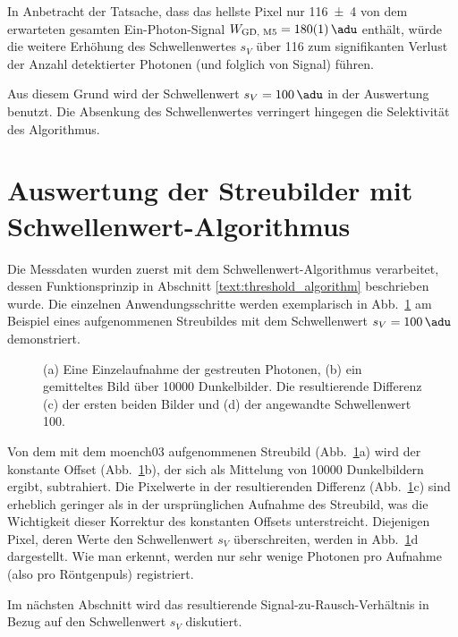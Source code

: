 \noindent
In Anbetracht der Tatsache, dass das hellste Pixel nur \SI{116(4)}{\adu} von dem erwarteten gesamten Ein-Photon-Signal $W_\text{GD, M5} = \SI{180(1)}{\adu}$ enthält, würde die weitere Erhöhung des Schwellenwertes $s_V$ über \SI{116}{\adu} zum signifikanten Verlust der Anzahl detektierter Photonen (und folglich von Signal) führen.

\noindent
Aus diesem Grund wird der Schwellenwert $s_V = \SI{100}{\adu}$ in der Auswertung benutzt. Die Absenkung des Schwellenwertes verringert hingegen die Selektivität des Algorithmus.

\section{Auswertung der Streubilder mit Schwellenwert-Algorithmus}
\label{text:streuung_counting}
Die Messdaten wurden zuerst mit dem Schwellenwert-Algorithmus verarbeitet, dessen Funktionsprinzip in Abschnitt \ref{text:threshold_algorithm} beschrieben wurde. Die einzelnen Anwendungsschritte werden exemplarisch in Abb.~\ref{fig:capture_ped_diff} am Beispiel eines aufgenommenen Streubildes mit dem Schwellenwert $s_V = \SI{100}{\adu}$ demonstriert.
\begin{figure}[H]
    \centering
    
    \caption{(a) Eine Einzelaufnahme der gestreuten Photonen, (b) ein gemitteltes Bild über \num{10000} Dunkelbilder.  Die resultierende Differenz (c) der ersten beiden Bilder und (d) der angewandte Schwellenwert \SI{100}{\adu}.}
    \label{fig:capture_ped_diff}
\end{figure}
\noindent
Von dem mit dem \gls{moench03} aufgenommenen Streubild (Abb.~\ref{fig:capture_ped_diff}a) wird der konstante Offset (Abb.~\ref{fig:capture_ped_diff}b), der sich als Mittelung von \num{10000} Dunkelbildern ergibt, subtrahiert. Die Pixelwerte in der resultierenden Differenz (Abb.~\ref{fig:capture_ped_diff}c) sind erheblich geringer als in der ursprünglichen Aufnahme des Streubild, was die Wichtigkeit dieser Korrektur des konstanten Offsets unterstreicht. Diejenigen Pixel, deren Werte den Schwellenwert $s_V$ überschreiten, werden in Abb.~\ref{fig:capture_ped_diff}d dargestellt. Wie man erkennt, werden nur sehr wenige Photonen pro Aufnahme (also pro Röntgenpuls) registriert.

\noindent
Im nächsten Abschnitt wird das resultierende Signal-zu-Rausch-Verhältnis in Bezug auf den Schwellenwert $s_V$ diskutiert.

